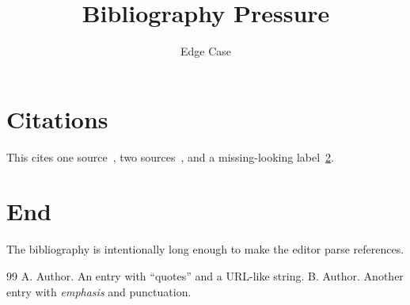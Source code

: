 \documentclass{article}
\title{Bibliography Pressure}
\author{Edge Case}
\begin{document}
\maketitle
\section{Citations}
This cites one source~\cite{alpha}, two sources~\cite{alpha,beta}, and a missing-looking label~\ref{sec:end}.
\section{End}\label{sec:end}
The bibliography is intentionally long enough to make the editor parse references.
\begin{thebibliography}{99}
 A. Author. An entry with ``quotes'' and a URL-like string.
 B. Author. Another entry with \emph{emphasis} and punctuation.
\end{thebibliography}
\end{document}
